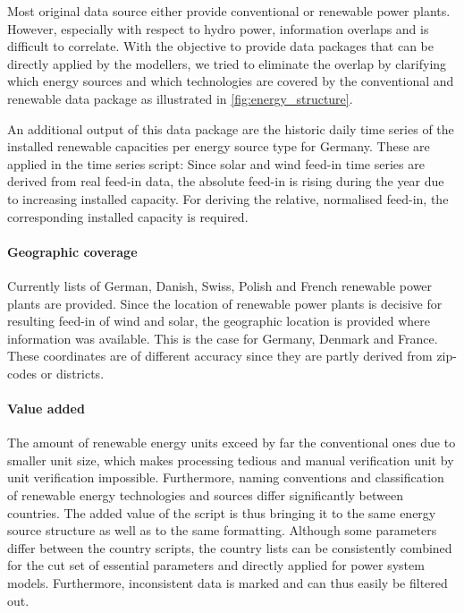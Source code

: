 \documentclass[article]{elsarticle}
\begin{document}
Most original data source either provide conventional or renewable power plants. However, especially with respect to hydro power, information overlaps and is difficult to correlate. With the objective to provide data packages that can be directly applied by the modellers, we tried to eliminate the overlap by clarifying which energy sources and which technologies are covered by the conventional and renewable data package as illustrated in \ref{fig:energy_structure}.

An additional output of this data package are the historic daily time series of the installed renewable capacities per energy source type for Germany. These are applied in the time series script: Since solar and wind feed-in time series are derived from real feed-in data, the absolute feed-in is rising during the year due to increasing installed capacity. For deriving the relative, normalised feed-in, the corresponding installed capacity is required.

\paragraph{Geographic coverage} Currently lists of German, Danish, Swiss, Polish and French renewable power plants are provided. Since the location of renewable power plants is decisive for resulting feed-in of wind and solar, the geographic location is provided where information was available. This is the case for Germany, Denmark and France. These coordinates are of different accuracy since they are partly derived from zip-codes or districts.

\paragraph{Value added}
The amount of renewable energy units exceed by far the conventional ones due to smaller unit size, which makes processing tedious and manual verification unit by unit verification impossible. Furthermore, naming conventions and classification of renewable energy technologies and sources differ significantly between countries. The added value of the script is thus bringing it to the same energy source structure as well as to the same formatting. Although some parameters differ between the country scripts, the country lists can be consistently combined for the cut set of essential parameters and directly applied for power system models. Furthermore, inconsistent data is marked and can thus easily be filtered out.
\end{document}
